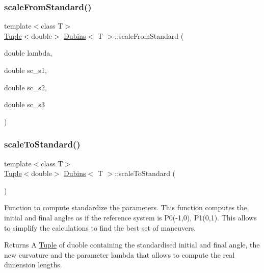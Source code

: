 \subsubsection{\texorpdfstring{scaleFromStandard()}{scaleFromStandard()}}
{\footnotesize\ttfamily template$<$class T$>$ \\
\mbox{\hyperlink{class_tuple}{Tuple}}$<$double$>$ \mbox{\hyperlink{class_dubins}{Dubins}}$<$ T $>$\+::scale\+From\+Standard (\begin{DoxyParamCaption}\item[{double}]{lambda,  }\item[{double}]{sc\+\_\+s1,  }\item[{double}]{sc\+\_\+s2,  }\item[{double}]{sc\+\_\+s3 }\end{DoxyParamCaption})\hspace{0.3cm}{\ttfamily [inline]}}

\mbox{\label{class_dubins_afecc4ffa89c5f3952b1729edb87ac88c}} 
\subsubsection{\texorpdfstring{scaleToStandard()}{scaleToStandard()}}
{\footnotesize\ttfamily template$<$class T$>$ \\
\mbox{\hyperlink{class_tuple}{Tuple}}$<$double$>$ \mbox{\hyperlink{class_dubins}{Dubins}}$<$ T $>$\+::scale\+To\+Standard (\begin{DoxyParamCaption}{ }\end{DoxyParamCaption})\hspace{0.3cm}{\ttfamily [inline]}}



Function to compute standardize the parameters. This function computes the initial and final angles as if the reference system is P0(-\/1,0), P1(0,1). This allows to simplify the calculations to find the best set of maneuvers. 

\begin{DoxyReturn}{Returns}
A {\ttfamily \mbox{\hyperlink{class_tuple}{Tuple}}} of {\ttfamily duoble} containing the standardised initial and final angle, the new curvature and the parameter lambda that allows to compute the real dimension lengths. 
\end{DoxyReturn}
\mbox{\label{class_dubins_a52681fe06e50899b5296204a312233ce}} 
